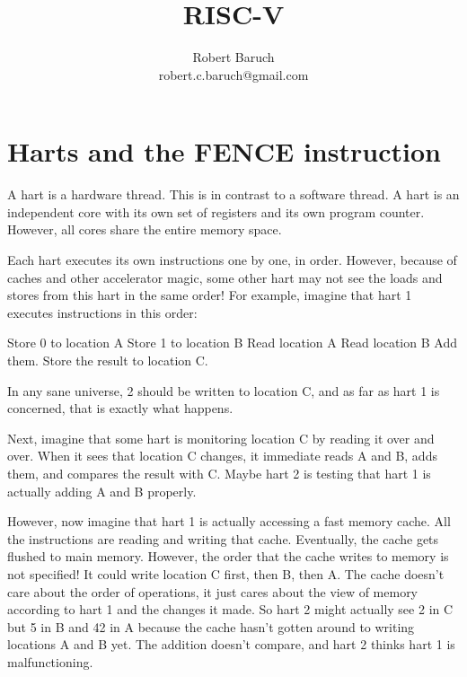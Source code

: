 \documentclass[11pt,twoside,letterpaper,titlepage]{report}
\author{Robert Baruch \\ robert.c.baruch@gmail.com}
\title{RISC-V}
\begin{document}
\begin{titlepage}
\maketitle
\end{titlepage}

\chapter{Harts and the FENCE instruction}

A hart is a hardware thread. This is in contrast to a software thread. A hart is an independent
core with its own set of registers and its own program counter. However, all cores share the
entire memory space.

\par
Each hart executes its own instructions one by one, in order. However, because of caches
and other accelerator magic, some other hart may not see the loads and stores from this
hart in the same order! For example, imagine that hart 1 executes instructions in this order:

\par
Store 0 to location A
Store 1 to location B
Read location A
Read location B
Add them.
Store the result to location C.

\par
In any sane universe, 2 should be written to location C, and as far as hart 1 is concerned,
that is exactly what happens.

\par
Next, imagine that some hart is monitoring location C by reading it over and over. When it
sees that location C changes, it immediate reads A and B, adds them, and compares the result
with C. Maybe hart 2 is testing that hart 1 is actually adding A and B properly.

\par
However, now imagine that hart 1 is actually accessing a fast memory cache. All the instructions
are reading and writing that cache. Eventually, the cache gets flushed to main memory. However,
the order that the cache writes to memory is not specified! It could write location C first,
then B, then A. The cache doesn't care about the order of operations, it just cares about
the view of memory according to hart 1 and the changes it made. So hart 2 might 
actually see 2 in C but 5 in B and 42 in A because the cache hasn't gotten around to 
writing locations A and B yet. The addition doesn't compare, and hart 2 thinks hart 1 is
malfunctioning.
\end{document}
